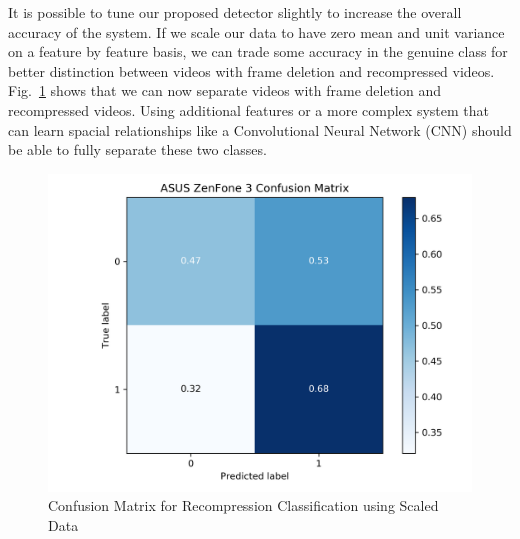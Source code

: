 It is possible to tune our proposed detector slightly to increase the overall accuracy of the system. If we scale our data to have zero mean and unit variance on a feature by feature basis, we can trade some accuracy in the genuine class for better distinction between videos with frame deletion and recompressed videos. Fig.~\ref{scaledcm} shows that we can now separate videos with frame deletion and recompressed videos. Using additional features or a more complex system that can learn spacial relationships like a Convolutional Neural Network (CNN) should be able to fully separate these two classes.
%
\begin{figure}[htbp]
\centerline{\includegraphics[width=0.67\linewidth]{ExperimentalResults/scaled_cm.png}}
\caption{Confusion Matrix for Recompression Classification using Scaled Data}
\label{scaledcm}
\end{figure}